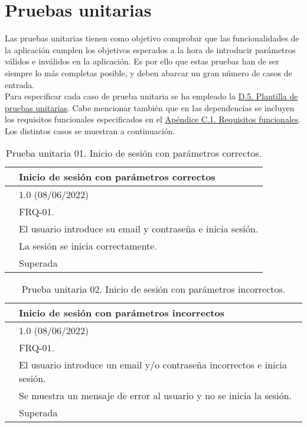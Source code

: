 \section{Pruebas unitarias}

Las pruebas unitarias \cite{pruebaunitaria} tienen como objetivo comprobar que las funcionalidades de la aplicación cumplen los objetivos esperados a la hora de introducir parámetros válidos e inválidos en la aplicación. Es por ello que estas pruebas han de ser siempre lo más completas posible, y deben abarcar un gran número de casos de entrada.
\\

Para especificar cada caso de prueba unitaria se ha empleado la \hyperref[enlacePUX]{D.5. Plantilla de pruebas unitarias}. Cabe mencionar también que en las dependencias se incluyen los requisitos funcionales especificados en el \hyperref[APRequisitosFuncionales]{Apéndice C.1. Requisitos funcionales}. Los distintos casos se muestran a continuación.

\begin{table}[H]
\begin{center}
\begin{tabular}{|p{3cm}|p{10cm}|} \hline
\centering {\bf PU-01} & Inicio de sesión con parámetros correctos  \\ \hline\hline
\centering {\bf Versión} & 1.0 (08/06/2022) \\ \hline
\centering {\bf Dependencias} &  FRQ-01. \\ \hline
\centering {\bf Descripción} &  El usuario introduce su email y contraseña e inicia sesión. \\ \hline
\centering {\bf Criterio de aceptación} & La sesión se inicia correctamente. \\ \hline
\centering {\bf Estado} & Superada \\ \hline
\end{tabular}
\caption{Prueba unitaria 01. Inicio de sesión con parámetros correctos.}
\label{enlacePU1}
\end{center}
\end{table}

\begin{table}[H]
\begin{center}
\begin{tabular}{|p{3cm}|p{10cm}|} \hline
\centering {\bf PU-02} & Inicio de sesión con parámetros incorrectos  \\ \hline\hline
\centering {\bf Versión} & 1.0 (08/06/2022) \\ \hline
\centering {\bf Dependencias} & FRQ-01. \\ \hline
\centering {\bf Descripción} &  El usuario introduce un email y/o contraseña incorrectos e inicia sesión. \\ \hline
\centering {\bf Criterio de aceptación} & Se muestra un mensaje de error al usuario y no se inicia la sesión. \\ \hline
\centering {\bf Estado} & Superada \\ \hline
\end{tabular}
\caption{Prueba unitaria 02. Inicio de sesión con parámetros incorrectos.}
\label{enlacePU2}
\end{center}
\end{table}


